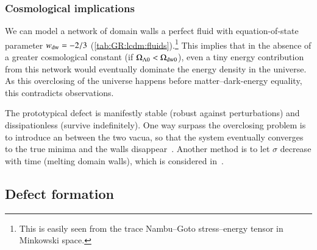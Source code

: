     \subsubsection{Cosmological implications}
        We can model a network of domain walls a perfect fluid with equation-of-state parameter $w_\mathrm{dw}= -2/3$ (\cref{tab:GR:lcdm:fluids}).\footnote{This is easily seen from the trace Nambu--Goto stress--energy tensor in Minkowski space.} This implies that in the absence of a greater cosmological constant (if $\Omega_{\Lambda 0} < \Omega_\mathrm{dw0}$), 
        even a tiny energy contribution from this network would eventually dominate the energy density in the universe. As this overclosing of the universe happens before matter--dark-energy equality, this contradicts observations.

        The prototypical defect is manifestly stable (robust against perturbations) and dissipationless (survive indefinitely). One way surpass the overclosing problem is to introduce an  between the two vacua, so that the system eventually converges to the true minima and the walls disappear~\citep{saikawaReviewGravitationalWaves2017}. Another method is to let $\sigma$ decrease with time (melting domain walls), which is considered in~\citet{babichevNANOGravSpectralIndex2023}.


















\subsection{Defect formation}\label{sec:cosmo:defects:formation}

